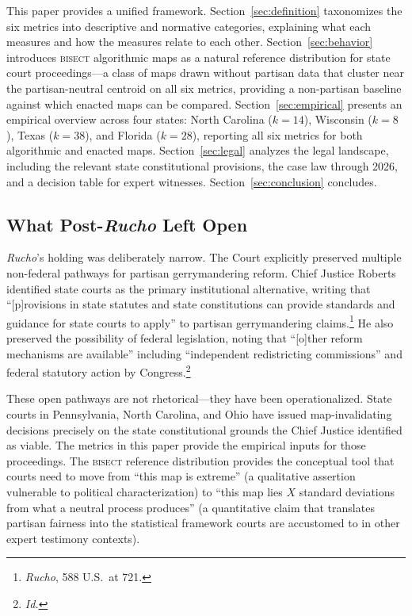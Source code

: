 This paper provides a unified framework. Section~\ref{sec:definition} taxonomizes the
six metrics into descriptive and normative categories, explaining what each measures
and how the measures relate to each other. Section~\ref{sec:behavior} introduces
\textsc{bisect} algorithmic maps as a natural reference distribution for state court
proceedings---a class of maps drawn without partisan data that cluster near the
partisan-neutral centroid on all six metrics, providing a non-partisan baseline
against which enacted maps can be compared. Section~\ref{sec:empirical} presents
an empirical overview across four states: North Carolina ($k=14$), Wisconsin ($k=8$),
Texas ($k=38$), and Florida ($k=28$), reporting all six metrics for both algorithmic
and enacted maps. Section~\ref{sec:legal} analyzes the legal landscape, including
the relevant state constitutional provisions, the case law through 2026, and a
decision table for expert witnesses. Section~\ref{sec:conclusion} concludes.

\subsection{What Post-\textit{Rucho} Left Open}

\textit{Rucho}'s holding was deliberately narrow. The Court explicitly preserved
multiple non-federal pathways for partisan gerrymandering reform. Chief Justice
Roberts identified state courts as the primary institutional alternative, writing
that ``[p]rovisions in state statutes and state constitutions can provide standards
and guidance for state courts to apply'' to partisan gerrymandering claims.\footnote{
\textit{Rucho}, 588 U.S.\ at 721.} He also preserved the possibility of federal
legislation, noting that ``[o]ther reform mechanisms are available'' including
``independent redistricting commissions'' and federal statutory action by Congress.\footnote{
\textit{Id.}}

These open pathways are not rhetorical---they have been operationalized. State courts
in Pennsylvania, North Carolina, and Ohio have issued map-invalidating decisions
precisely on the state constitutional grounds the Chief Justice identified as viable.
The metrics in this paper provide the empirical inputs for those proceedings.
The \textsc{bisect} reference distribution provides the conceptual tool that courts
need to move from ``this map is extreme'' (a qualitative assertion vulnerable to
political characterization) to ``this map lies $X$ standard deviations from what
a neutral process produces'' (a quantitative claim that translates partisan fairness
into the statistical framework courts are accustomed to in other expert testimony contexts).

